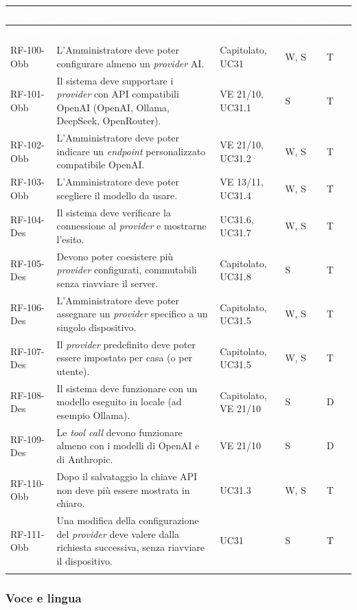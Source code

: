 \documentclass[12pt,a4paper]{article}
\newcommand{\thc}[1]{\textcolor{white}{\textbf{#1}}}
\newcommand{\rl}{\\ \arrayrulecolor{bfline}\hline}
\begin{document}
\begin{longtable}{>{\raggedright\arraybackslash}p{}>{\raggedright\arraybackslash}p{}>{\raggedright\arraybackslash}p{}>{\raggedright\arraybackslash}p{}>{\centering\arraybackslash}p{}}
\rowcolor{bfblue}\thc{Codice} & \thc{Descrizione} & \thc{Fonti} & \thc{Comp.} & \thc{Ver.} \\
\endfirsthead
\rowcolor{bfblue}\thc{Codice} & \thc{Descrizione} & \thc{Fonti} & \thc{Comp.} & \thc{Ver.} \\
\endhead
RF-100-Obb & L'Amministratore deve poter configurare almeno un \emph{provider} AI. & Capitolato, UC31 & W, S & T \rl
RF-101-Obb & Il sistema deve supportare i \emph{provider} con API compatibili OpenAI (OpenAI, Ollama, DeepSeek, OpenRouter). & VE 21/10, UC31.1 & S & T \rl
RF-102-Obb & L'Amministratore deve poter indicare un \emph{endpoint} personalizzato compatibile OpenAI. & VE 21/10, UC31.2 & W, S & T \rl
RF-103-Obb & L'Amministratore deve poter scegliere il modello da usare. & VE 13/11, UC31.4 & W, S & T \rl
RF-104-Des & Il sistema deve verificare la connessione al \emph{provider} e mostrarne l'esito. & UC31.6, UC31.7 & W, S & T \rl
RF-105-Des & Devono poter coesistere più \emph{provider} configurati, commutabili senza riavviare il server. & Capitolato, UC31.8 & S & T \rl
RF-106-Des & L'Amministratore deve poter assegnare un \emph{provider} specifico a un singolo dispositivo. & Capitolato, UC31.5 & W, S & T \rl
RF-107-Des & Il \emph{provider} predefinito deve poter essere impostato per casa (o per utente). & Capitolato, UC31.5 & W, S & T \rl
RF-108-Des & Il sistema deve funzionare con un modello eseguito in locale (ad esempio Ollama). & Capitolato, VE 21/10 & S & D \rl
RF-109-Des & Le \emph{tool call} devono funzionare almeno con i modelli di OpenAI e di Anthropic. & VE 21/10 & S & D \rl
RF-110-Obb & Dopo il salvataggio la chiave API non deve più essere mostrata in chiaro. & UC31.3 & W, S & T \rl
RF-111-Obb & Una modifica della configurazione del \emph{provider} deve valere dalla richiesta successiva, senza riavviare il dispositivo. & UC31 & S & T \rl
\end{longtable}

\subsubsection{Voce e lingua}
\end{document}
